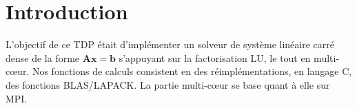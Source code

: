 \section*{Introduction}

L'objectif de ce TDP était d'implémenter un solveur de système linéaire carré dense de la forme $\mathbf{Ax} = \mathbf{b}$ s'appuyant sur la factorisation LU, le tout en multi-cœur. Nos fonctions de calculs consistent en des réimplémentations, en langage C, des fonctions BLAS/LAPACK. La partie multi-cœur se base quant à elle sur MPI.